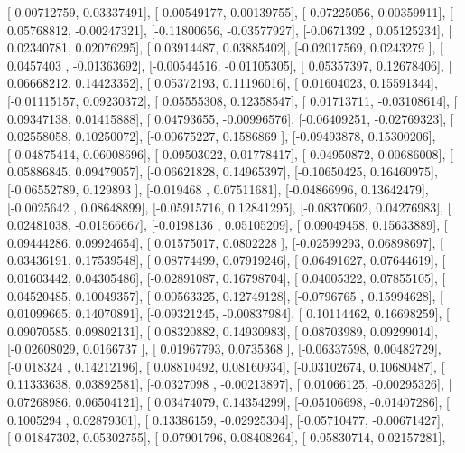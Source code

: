 \documentclass{article}
\begin{document}
       [-0.00712759,  0.03337491],
       [-0.00549177,  0.00139755],
       [ 0.07225056,  0.00359911],
       [ 0.05768812, -0.00247321],
       [-0.11800656, -0.03577927],
       [-0.0671392 ,  0.05125234],
       [ 0.02340781,  0.02076295],
       [ 0.03914487,  0.03885402],
       [-0.02017569,  0.0243279 ],
       [ 0.0457403 , -0.01363692],
       [-0.00544516, -0.01105305],
       [ 0.05357397,  0.12678406],
       [ 0.06668212,  0.14423352],
       [ 0.05372193,  0.11196016],
       [ 0.01604023,  0.15591344],
       [-0.01115157,  0.09230372],
       [ 0.05555308,  0.12358547],
       [ 0.01713711, -0.03108614],
       [ 0.09347138,  0.01415888],
       [ 0.04793655, -0.00996576],
       [-0.06409251, -0.02769323],
       [ 0.02558058,  0.10250072],
       [-0.00675227,  0.1586869 ],
       [-0.09493878,  0.15300206],
       [-0.04875414,  0.06008696],
       [-0.09503022,  0.01778417],
       [-0.04950872,  0.00686008],
       [ 0.05886845,  0.09479057],
       [-0.06621828,  0.14965397],
       [-0.10650425,  0.16460975],
       [-0.06552789,  0.129893  ],
       [-0.019468  ,  0.07511681],
       [-0.04866996,  0.13642479],
       [-0.0025642 ,  0.08648899],
       [-0.05915716,  0.12841295],
       [-0.08370602,  0.04276983],
       [ 0.02481038, -0.01566667],
       [-0.0198136 ,  0.05105209],
       [ 0.09049458,  0.15633889],
       [ 0.09444286,  0.09924654],
       [ 0.01575017,  0.0802228 ],
       [-0.02599293,  0.06898697],
       [ 0.03436191,  0.17539548],
       [ 0.08774499,  0.07919246],
       [ 0.06491627,  0.07644619],
       [ 0.01603442,  0.04305486],
       [-0.02891087,  0.16798704],
       [ 0.04005322,  0.07855105],
       [ 0.04520485,  0.10049357],
       [ 0.00563325,  0.12749128],
       [-0.0796765 ,  0.15994628],
       [ 0.01099665,  0.14070891],
       [-0.09321245, -0.00837984],
       [ 0.10114462,  0.16698259],
       [ 0.09070585,  0.09802131],
       [ 0.08320882,  0.14930983],
       [ 0.08703989,  0.09299014],
       [-0.02608029,  0.0166737 ],
       [ 0.01967793,  0.0735368 ],
       [-0.06337598,  0.00482729],
       [-0.018324  ,  0.14212196],
       [ 0.08810492,  0.08160934],
       [-0.03102674,  0.10680487],
       [ 0.11333638,  0.03892581],
       [-0.0327098 , -0.00213897],
       [ 0.01066125, -0.00295326],
       [ 0.07268986,  0.06504121],
       [ 0.03474079,  0.14354299],
       [-0.05106698, -0.01407286],
       [ 0.1005294 ,  0.02879301],
       [ 0.13386159, -0.02925304],
       [-0.05710477, -0.00671427],
       [-0.01847302,  0.05302755],
       [-0.07901796,  0.08408264],
       [-0.05830714,  0.02157281],
\end{document}

